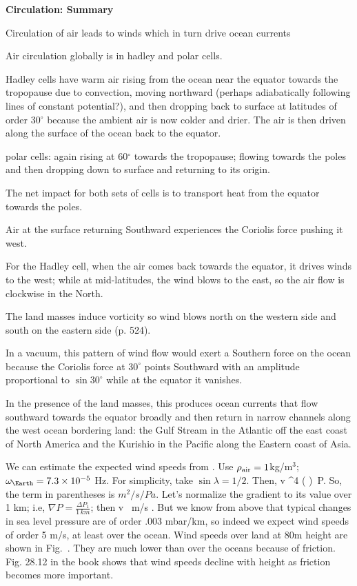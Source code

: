 \documentclass[11pt]{book}
\begin{document}
{\bf Circulation: Summary}
\bei
\item Circulation of air leads to winds which in turn drive ocean currents
\item Air circulation globally is in hadley and polar cells. 
\item Hadley cells have warm air rising from the ocean near the equator towards the tropopause due to convection, moving northward (perhaps adiabatically following lines of constant potential?), and then dropping back to surface at latitudes of order 30$^\circ$ because the ambient air is now colder and drier. 
The air is then driven along the surface of the ocean back to the equator.
\item polar cells: again rising at 60$^\circ$ towards the tropopause; flowing towards the poles and then dropping down to surface and returning to its origin.
\item The net impact for both sets of cells is to transport heat from the equator towards the poles.
\item Air at the surface returning Southward experiences the Coriolis force pushing it west.
\item For the Hadley cell, when the air comes back towards the equator, it drives winds to the west; while at mid-latitudes, the wind blows to the east, so the air flow is clockwise in the North.
\item The land masses induce vorticity so wind blows north on the western side and south on the eastern side (p. 524). 
\item In a vacuum, this pattern of wind flow would exert a Southern force on the ocean because the Coriolis force at $30^\circ$ points Southward with an amplitude proportional to $\sin 30^\circ$ while at the equator it vanishes. 
\item In the presence of the land masses, this produces ocean currents that flow southward towards the equator broadly and then return in narrow channels along the west ocean bordering land: the Gulf Stream in the Atlantic off the east coast of North America and the Kurishio in the Pacific along the Eastern coast of Asia.
\eei


We can estimate the expected wind speeds from . Use $\rho_{\rm air}=1$kg/m$^3$; $\omega_\Earth= 7.3\times 10^{-5}$ Hz. For simplicity, take $\sin\lambda=1/2$. Then,
\be
v ^4 \left( \right)\, \nabla P.\ee
So, the term in parentheses is
$m^2/s/Pa$. Let's normalize the gradient to its value over 1 km; i.e, $\nabla P =\frac{\Delta P_1}{1\,km}$; then
\be
v \, m/s 
.\ee
But we know from above that typical changes in sea level pressure are of order .003 mbar/km, so indeed we expect wind speeds of order 5 m/s, at least over the ocean.
Wind speeds over land at 80m height are shown in Fig.~. They are much lower than over the oceans because of friction.
Fig. 28.12 in the book shows that wind speeds decline with height as friction becomes more important.
\end{document}
